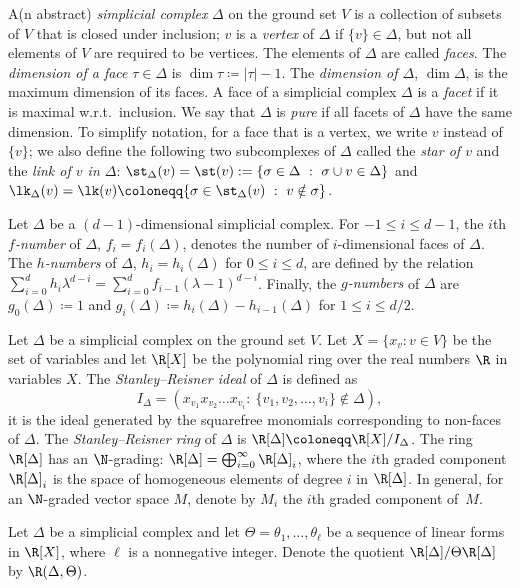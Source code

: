 A(n abstract) \emph{simplicial complex} $\Delta$ on the ground set $V$ is a collection of subsets of $V$ that is closed under inclusion; $v$ is a \emph{vertex} of $\Delta$ if $\{v\}\in \Delta$, but not all elements of $V$ are required to be vertices. The elements of $\Delta$ are called \emph{faces}. The \emph{dimension of a face} $\tau\in\Delta$ is $\dim\tau\coloneqq |\tau|-1$. The \emph{dimension of $\Delta$}, $\dim\Delta$, is the maximum dimension of its faces. A face of a simplicial complex $\Delta$ is a \emph{facet} if it is maximal w.r.t.~inclusion. We say that $\Delta$ is \emph{pure} if all facets of $\Delta$ have the same dimension. To simplify notation, for a face that is a vertex, we write $v$ instead of $\{v\}$; we also define the following two subcomplexes of $\Delta$ called the \emph{star of $v$} and the \emph{link of $v$ in $\Delta$}:
$\st_\Delta(v)=\st(v):=\{\sigma\in\Delta \ : \ \sigma\cup v\in\Delta\}$ and $\lk_\Delta(v)=\lk(v)\coloneqq  \{\sigma\in \st_\Delta(v) \ : \ v\notin\sigma\}$.


Let $\Delta$ be a $(d-1)$-dimensional simplicial complex. For $-1 \leq i \leq d-1$, the $i$th \emph{$f$-number} of $\Delta$, $f_i = f_i(\Delta)$, denotes the number of $i$-dimensional faces of $\Delta$. The \emph{$h$-numbers} of $\Delta$, $h_i=h_i(\Delta)$ for $0 \leq i \leq d$, are defined by the relation $\sum_{i=0}^{d}h_i\lambda^{d-i}=\sum_{i=0}^{d}f_{i-1}(\lambda-1)^{d-i}$. Finally, the \emph{$g$-numbers} of $\Delta$ are $g_0(\Delta)\coloneqq 1$ and $g_i(\Delta)\coloneqq h_i(\Delta)-h_{i-1}(\Delta)$ for $1 \leq i \leq d/2$.



Let $\Delta$ be a simplicial complex on the ground set $V$. Let $X = \{x_v : v \in V\}$ be the set of variables and let $\R[X]$ be the polynomial ring over the real numbers $\R$ in variables $X$. The \emph{Stanley--Reisner ideal} of $\Delta$ is defined as 
\[
I_\Delta=\left(x_{v_1}x_{v_2}\dots x_{v_i}: \ \{v_1, v_2, \dots, v_i\}\notin \Delta\right),
\] 
\ie
it is the ideal generated by the squarefree monomials corresponding to non-faces of $\Delta$. The \emph{Stanley--Reisner ring} of $\Delta$ is $\R[\Delta] \coloneqq  \R[X]/I_\Delta$. The ring $\R[\Delta]$ has an $\N$-grading: $\R[\Delta]= \bigoplus_{i=0}^{\infty} \R[\Delta]_i$, where the $i$th graded component $\R[\Delta]_i$ is the space of homogeneous elements of degree $i$ in $\R[\Delta]$. In general, for an $\N$-graded vector space $M$, denote by $M_i$ the $i$th graded component of~$M$.

Let $\Delta$ be a simplicial complex and let $\Theta=\theta_1,\ldots,\theta_\ell$ be a sequence of linear forms in $\R[X]$, where $\ell$ is a nonnegative integer. Denote the quotient $\R[\Delta]/\Theta\R[\Delta]$ by $\R(\Delta,\Theta)$. 

